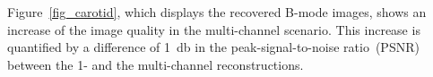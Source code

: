 \documentclass{article}
\theoremstyle{definition}
\begin{document}
Figure~\ref{fig_carotid}, which displays the recovered B-mode images, shows an increase of the image quality in the multi-channel scenario. This increase is quantified by a difference of \SI{1}{\decibel} in the peak-signal-to-noise ratio~(PSNR) between the 1- and the multi-channel reconstructions. 
\setlength{\CohSubFigWidth}{0.24\textwidth}
\end{document}
